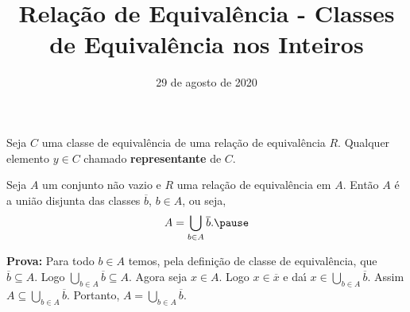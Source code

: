 \documentclass{beamer}
\title{Rela\c{c}\~ao de Equival\^encia - Classes de Equivalência nos Inteiros}
\author[\autor]{\autor}
\institute[\instituto]{\instituto}
\date{29 de agosto de 2020}
\begin{document}
    \begin{frame}
        \maketitle
    \end{frame}


    \begin{frame}
        \begin{definicao}
            Seja $C$ uma classe de equival{\^e}ncia \pause de uma rela{\c c}{\~a}o de equival{\^e}ncia $R$. \pause Qualquer elemento $y\in C$  chamado \textbf{representante} de $C$.\pause
        \end{definicao}

        \begin{proposicao}
            Seja $A$ um conjunto n{\~a}o vazio \pause e $R$ uma rela{\c c}{\~a}o de equival{\^e}ncia em $A$. \pause Ent{\~a}o $A$ {\'e} a uni{\~a}o disjunta das classes $\overline{b}$, $b \in A$, ou seja,\pause
            \[
                A = \bigcup_{b\in A}\overline{b}.\pause
            \]
        \end{proposicao}
        \noindent\textbf{Prova:}
            Para todo $b\in A$ temos, \pause pela defini\c{c}\~ao de classe de equival\^encia, que $\overline{b}\subseteq A$. \pause Logo $\bigcup_{b\in A}\overline{b}\subseteq A$. \pause Agora seja $x\in A$. \pause Logo $x \in \overline{x}$ \pause e da{\'\i} $x\in \bigcup_{b\in A}\overline{b}$. \pause Assim $A\subseteq\bigcup_{b\in A}\overline{b}$. \pause Portanto, $A=\bigcup_{b\in A}\overline{b}$.\hspace{.5cm}\qedsymbol\pause
    \end{frame}

    \begin{frame}
        
    \end{frame}
\end{document}
